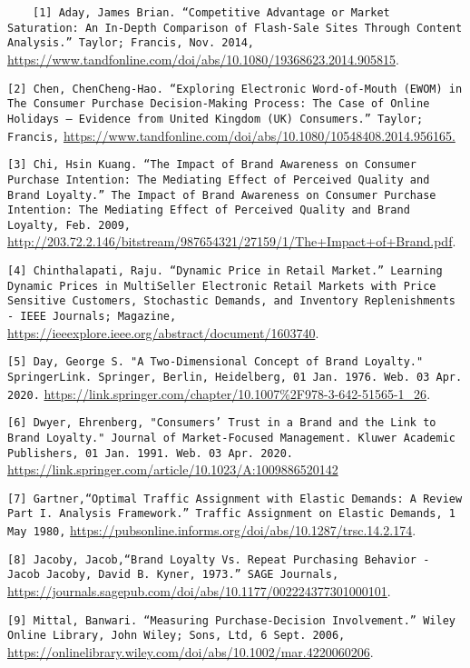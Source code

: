 \ \ \ \ 
\texttt{[1] Aday, James Brian. “Competitive Advantage or Market Saturation: An In-Depth Comparison of Flash-Sale Sites Through Content Analysis.” Taylor; Francis, Nov. 2014,}
\url{https://www.tandfonline.com/doi/abs/10.1080/19368623.2014.905815}.

\texttt{[2] Chen, ChenCheng-Hao. “Exploring Electronic Word-of-Mouth (EWOM) in The Consumer Purchase Decision-Making Process: The Case of Online Holidays – Evidence from United Kingdom (UK) Consumers.” Taylor; Francis,}
\url{ https://www.tandfonline.com/doi/abs/10.1080/10548408.2014.956165.}

\texttt{[3] Chi, Hsin  Kuang. “The Impact of Brand Awareness on Consumer Purchase Intention: The Mediating Effect of Perceived Quality and Brand Loyalty.” The Impact of Brand Awareness on Consumer Purchase Intention: The Mediating Effect of Perceived Quality and Brand Loyalty, Feb. 2009,} \url{http://203.72.2.146/bitstream/987654321/27159/1/The+Impact+of+Brand.pdf}.

\texttt{[4] Chinthalapati, Raju. “Dynamic Price in Retail Market.” Learning Dynamic Prices in MultiSeller Electronic Retail Markets with Price Sensitive Customers, Stochastic Demands, and Inventory Replenishments - IEEE Journals; Magazine,}
\url{https://ieeexplore.ieee.org/abstract/document/1603740}.

\texttt{[5] Day, George S. "A Two-Dimensional Concept of Brand Loyalty." SpringerLink. Springer, Berlin, Heidelberg, 01 Jan. 1976. Web. 03 Apr. 2020.}
\url{https://link.springer.com/chapter/10.1007%2F978-3-642-51565-1_26}.

\texttt{[6] Dwyer, Ehrenberg, "Consumers' Trust in a Brand and the Link to Brand Loyalty." Journal of Market-Focused Management. Kluwer Academic Publishers, 01 Jan. 1991. Web. 03 Apr. 2020.} \url{https://link.springer.com/article/10.1023/A:1009886520142}

\texttt{[7] Gartner,“Optimal Traffic Assignment with Elastic Demands: A Review Part I. Analysis Framework.” Traffic Assignment on Elastic Demands, 1 May 1980,}
\url{https://pubsonline.informs.org/doi/abs/10.1287/trsc.14.2.174}.

\texttt{[8] Jacoby, Jacob,“Brand Loyalty Vs. Repeat Purchasing Behavior - Jacob Jacoby, David B. Kyner, 1973.” SAGE Journals,} 
\url{https://journals.sagepub.com/doi/abs/10.1177/002224377301000101}.

\texttt{[9] Mittal, Banwari. “Measuring Purchase‐Decision Involvement.” Wiley Online Library, John Wiley; Sons, Ltd, 6 Sept. 2006,} 
\url{https://onlinelibrary.wiley.com/doi/abs/10.1002/mar.4220060206}.

